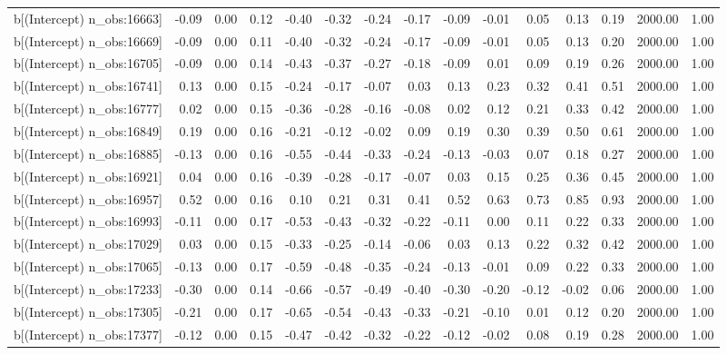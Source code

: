 \begin{table}[ht]
\begin{tabular}{rrrrrrrrrrrrrrr}
  b[(Intercept) n\_obs:16663] & -0.09 & 0.00 & 0.12 & -0.40 & -0.32 & -0.24 & -0.17 & -0.09 & -0.01 & 0.05 & 0.13 & 0.19 & 2000.00 & 1.00 \\ 
  b[(Intercept) n\_obs:16669] & -0.09 & 0.00 & 0.11 & -0.40 & -0.32 & -0.24 & -0.17 & -0.09 & -0.01 & 0.05 & 0.13 & 0.20 & 2000.00 & 1.00 \\ 
  b[(Intercept) n\_obs:16705] & -0.09 & 0.00 & 0.14 & -0.43 & -0.37 & -0.27 & -0.18 & -0.09 & 0.01 & 0.09 & 0.19 & 0.26 & 2000.00 & 1.00 \\ 
  b[(Intercept) n\_obs:16741] & 0.13 & 0.00 & 0.15 & -0.24 & -0.17 & -0.07 & 0.03 & 0.13 & 0.23 & 0.32 & 0.41 & 0.51 & 2000.00 & 1.00 \\ 
  b[(Intercept) n\_obs:16777] & 0.02 & 0.00 & 0.15 & -0.36 & -0.28 & -0.16 & -0.08 & 0.02 & 0.12 & 0.21 & 0.33 & 0.42 & 2000.00 & 1.00 \\ 
  b[(Intercept) n\_obs:16849] & 0.19 & 0.00 & 0.16 & -0.21 & -0.12 & -0.02 & 0.09 & 0.19 & 0.30 & 0.39 & 0.50 & 0.61 & 2000.00 & 1.00 \\ 
  b[(Intercept) n\_obs:16885] & -0.13 & 0.00 & 0.16 & -0.55 & -0.44 & -0.33 & -0.24 & -0.13 & -0.03 & 0.07 & 0.18 & 0.27 & 2000.00 & 1.00 \\ 
  b[(Intercept) n\_obs:16921] & 0.04 & 0.00 & 0.16 & -0.39 & -0.28 & -0.17 & -0.07 & 0.03 & 0.15 & 0.25 & 0.36 & 0.45 & 2000.00 & 1.00 \\ 
  b[(Intercept) n\_obs:16957] & 0.52 & 0.00 & 0.16 & 0.10 & 0.21 & 0.31 & 0.41 & 0.52 & 0.63 & 0.73 & 0.85 & 0.93 & 2000.00 & 1.00 \\ 
  b[(Intercept) n\_obs:16993] & -0.11 & 0.00 & 0.17 & -0.53 & -0.43 & -0.32 & -0.22 & -0.11 & 0.00 & 0.11 & 0.22 & 0.33 & 2000.00 & 1.00 \\ 
  b[(Intercept) n\_obs:17029] & 0.03 & 0.00 & 0.15 & -0.33 & -0.25 & -0.14 & -0.06 & 0.03 & 0.13 & 0.22 & 0.32 & 0.42 & 2000.00 & 1.00 \\ 
  b[(Intercept) n\_obs:17065] & -0.13 & 0.00 & 0.17 & -0.59 & -0.48 & -0.35 & -0.24 & -0.13 & -0.01 & 0.09 & 0.22 & 0.33 & 2000.00 & 1.00 \\ 
  b[(Intercept) n\_obs:17233] & -0.30 & 0.00 & 0.14 & -0.66 & -0.57 & -0.49 & -0.40 & -0.30 & -0.20 & -0.12 & -0.02 & 0.06 & 2000.00 & 1.00 \\ 
  b[(Intercept) n\_obs:17305] & -0.21 & 0.00 & 0.17 & -0.65 & -0.54 & -0.43 & -0.33 & -0.21 & -0.10 & 0.01 & 0.12 & 0.20 & 2000.00 & 1.00 \\ 
  b[(Intercept) n\_obs:17377] & -0.12 & 0.00 & 0.15 & -0.47 & -0.42 & -0.32 & -0.22 & -0.12 & -0.02 & 0.08 & 0.19 & 0.28 & 2000.00 & 1.00 \\ 

\end{tabular}
\end{table}
